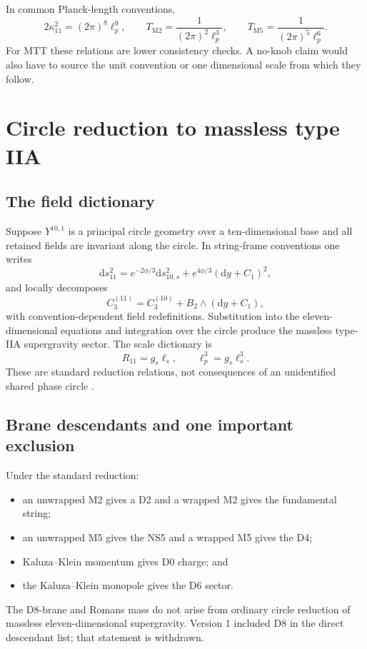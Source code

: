 \documentclass[11pt]{article}
\theoremstyle{definition}
\theoremstyle{remark}
\newcommand{\dd}{\mathrm d}
\begin{document}
In common Planck-length conventions,
\[
2\kappa_{11}^2=(2\pi)^8\ell_p^9,\qquad
T_{\mathrm{M2}}=\frac{1}{(2\pi)^2\ell_p^3},\qquad
T_{\mathrm{M5}}=\frac{1}{(2\pi)^5\ell_p^6}.
\]
For MTT these relations are lower consistency checks.  A no-knob claim would
also have to source the unit convention or one dimensional scale from which
they follow.

\section{Circle reduction to massless type IIA}
\label{sec:iia}

\subsection{The field dictionary}

Suppose \(Y^{10,1}\) is a principal circle geometry over a ten-dimensional
base and all retained fields are invariant along the circle.  In string-frame
conventions one writes
\begin{equation}
\dd s_{11}^2
=e^{-2\phi/3}\dd s_{10,s}^2
+e^{4\phi/3}(\dd y+C_1)^2,
\label{eq:metric-reduction}
\end{equation}
and locally decomposes
\begin{equation}
C_3^{(11)}
=C_3^{(10)}+B_2\wedge(\dd y+C_1),
\label{eq:c-reduction}
\end{equation}
with convention-dependent field redefinitions.  Substitution into the
eleven-dimensional equations and integration over the circle produce the
massless type-IIA supergravity sector.  The scale dictionary is
\[
R_{11}=g_s\ell_s,\qquad
\ell_p^3=g_s\ell_s^3 .
\]
These are standard reduction relations, not consequences of an unidentified
shared phase circle \cite{Witten1995,Polchinski1998}.

\subsection{Brane descendants and one important exclusion}

Under the standard reduction:
\begin{itemize}[leftmargin=1.7em]
\item an unwrapped M2 gives a D2 and a wrapped M2 gives the fundamental
      string;
\item an unwrapped M5 gives the NS5 and a wrapped M5 gives the D4;
\item Kaluza--Klein momentum gives D0 charge; and
\item the Kaluza--Klein monopole gives the D6 sector.
\end{itemize}
The D8-brane and Romans mass do not arise from ordinary circle reduction of
massless eleven-dimensional supergravity.  Version 1 included D8 in the
direct descendant list; that statement is withdrawn.
\end{document}
